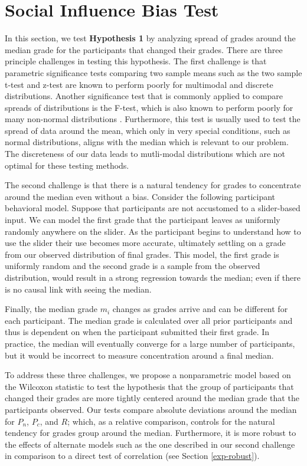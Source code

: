 \section{Social Influence Bias Test}\label{ht}
In this section, we test \textbf{Hypothesis 1} by analyzing spread of grades around the median grade for the participants that changed their grades.
There are three principle challenges in testing this hypothesis.
The first challenge is that parametric significance tests comparing two sample means such as the two sample t-test and z-test are known to 
perform poorly for multimodal and discrete distributions.
Another significance test that is commonly applied to compare spreads of distributions is the F-test, which is also known to perform poorly for many non-normal distributions \cite{markowski1990conditions}.
Furthermore, this test is usually used to test the spread of data around the mean, which only in very special conditions, such as normal distributions, aligns with the median which is relevant to our problem. 
The discreteness of our data leads to mutli-modal distributions which are not optimal for these testing methods.

The second challenge is that there is a natural tendency for grades to concentrate around the median even without a bias.
Consider the following participant behavioral model.
Suppose that participants are not accustomed to a slider-based input.
We can model the first grade that the participant leaves as uniformly randomly anywhere on the slider.
As the participant begins to understand how to use the slider their use becomes more accurate, ultimately settling on a grade from our observed distribution of final grades.
This model, the first grade is uniformly random and the second grade is a sample from the observed distribution, would result in a strong regression towards the median; even if there is no causal link with seeing the median.

Finally, the median grade $m_i$ changes as grades arrive and can be different for each participant.
The median grade is calculated over all prior participants and thus is dependent on when the participant submitted their first grade.
In practice, the median will eventually converge for a large number of participants, but it would be incorrect to measure concentration around a final median.

To address these three challenges, we propose a nonparametric model based on the Wilcoxon statistic to test the hypothesis that the group of participants that changed their grades are more tightly centered around the median grade that the participants observed.
Our tests compare absolute deviations around the median for $P_n$, $P_c$, and $R$; which, as a relative comparison, controls for the natural tendency for grades group around the median.
Furthermore, it is more robust to the effects of alternate models such as the one described in our second challenge in comparison to a direct test of correlation (see Section \ref{exp-robust}).

